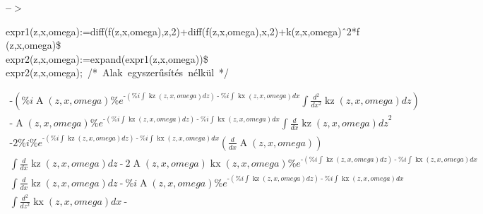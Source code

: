 \documentclass{article}
\begin{document}
\noindent
\begin{minipage}[t]{4.000000em}\color{red}\bfseries
 --\ensuremath{\ensuremath{>}}	
\end{minipage}
\begin{minipage}[t]{\textwidth}\color{blue}
expr1(z,x,omega):=diff(f(z,x,omega),z,2)+diff(f(z,x,omega),x,2)+k(z,x,omega)\^\ 2*f(z,x,omega)\$\\
expr2(z,x,omega):=expand(expr1(z,x,omega))\$\\
expr2(z,x,omega);\ /*\ Alak\ egyszerűsítés\ nélkül\ */
\end{minipage}
\begin{gather*} \tag{\% o4} 
\operatorname{-}\left( \% i \operatorname{A}\left( z\operatorname{,}x\operatorname{,}omega\right)  {{\% e}^{\operatorname{-}\left( \% i \int {\left. \operatorname{kz}\left( z\operatorname{,}x\operatorname{,}omega\right) dz\right.}\right) \operatorname{-}\% i \int {\left. \operatorname{kx}\left( z\operatorname{,}x\operatorname{,}omega\right) dx\right.}}} \int {\left. \frac{{{d}^{2}}}{d {{x}^{2}}} \operatorname{kz}\left( z\operatorname{,}x\operatorname{,}omega\right) dz\right.}\right) \\ \operatorname{-}\operatorname{A}\left( z\operatorname{,}x\operatorname{,}omega\right)  {{\% e}^{\operatorname{-}\left( \% i \int {\left. \operatorname{kz}\left( z\operatorname{,}x\operatorname{,}omega\right) dz\right.}\right) \operatorname{-}\% i \int {\left. \operatorname{kx}\left( z\operatorname{,}x\operatorname{,}omega\right) dx\right.}}}{{\int {\left. \frac{d}{d x} \operatorname{kz}\left( z\operatorname{,}x\operatorname{,}omega\right) dz\right.}}^{2}}\\ \operatorname{-}2 \% i {{\% e}^{\operatorname{-}\left( \% i \int {\left. \operatorname{kz}\left( z\operatorname{,}x\operatorname{,}omega\right) dz\right.}\right) \operatorname{-}\% i \int {\left. \operatorname{kx}\left( z\operatorname{,}x\operatorname{,}omega\right) dx\right.}}} \left( \frac{d}{d x} \operatorname{A}\left( z\operatorname{,}x\operatorname{,}omega\right) \right)  \\ \int {\left. \frac{d}{d x} \operatorname{kz}\left( z\operatorname{,}x\operatorname{,}omega\right) dz\right.}\operatorname{-}2 \operatorname{A}\left( z\operatorname{,}x\operatorname{,}omega\right)  \operatorname{kx}\left( z\operatorname{,}x\operatorname{,}omega\right) {{\% e}^{\operatorname{-}\left( \% i \int {\left. \operatorname{kz}\left( z\operatorname{,}x\operatorname{,}omega\right) dz\right.}\right) \operatorname{-}\% i \int {\left. \operatorname{kx}\left( z\operatorname{,}x\operatorname{,}omega\right) dx\right.}}} \\ \int {\left. \frac{d}{d x} \operatorname{kz}\left( z\operatorname{,}x\operatorname{,}omega\right) dz\right.}\operatorname{-}\% i \operatorname{A}\left( z\operatorname{,}x\operatorname{,}omega\right)  {{\% e}^{\operatorname{-}\left( \% i \int {\left. \operatorname{kz}\left( z\operatorname{,}x\operatorname{,}omega\right) dz\right.}\right) \operatorname{-}\% i \int {\left. \operatorname{kx}\left( z\operatorname{,}x\operatorname{,}omega\right) dx\right.}}} \\ \int {\left. \frac{{{d}^{2}}}{d {{z}^{2}}} \operatorname{kx}\left( z\operatorname{,}x\operatorname{,}omega\right) dx\right.}\operatorname{-
}
\end{gather*}
\end{document}
